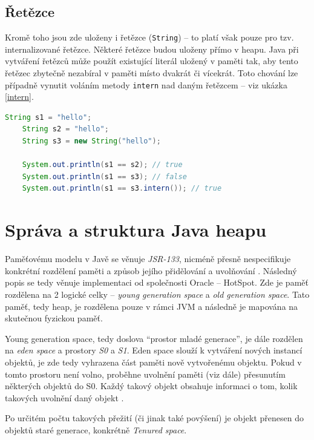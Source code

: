 \subsection{Řetězce}
\label{java-strings}
Kromě toho jsou zde uloženy i řetězce (\texttt{String}) -- to platí však pouze pro tzv. internalizované řetězce. Některé řetězce budou uloženy přímo v heapu. Java při vytváření řetězců může použít existující literál uložený v paměti tak, aby tento řetězec zbytečně nezabíral v paměti místo dvakrát či vícekrát. Toto chování lze případně vynutit voláním metody \texttt{intern} nad daným řetězcem -- viz ukázka \ref{intern}. 

\begin{lstlisting}[caption={Příklad uchovávání řetězců a metody \texttt{intern}}, label={intern}, frame={single}, language={java}, float,floatplacement=H]
    String s1 = "hello";
    String s2 = "hello";
    String s3 = new String("hello");

    System.out.println(s1 == s2); // true
    System.out.println(s1 == s3); // false
    System.out.println(s1 == s3.intern()); // true
\end{lstlisting}

\section{Správa a struktura Java heapu}
\label{memory-management}

Paměťovému modelu v Javě se věnuje \textit{JSR-133}, nicméně přesně nespecifikuje konkrétní rozdělení paměti a způsob jejího přidělování a uvolňování \cite{jsr133}. Následný popis se tedy věnuje implementaci od společnosti Oracle – HotSpot. Zde je paměť rozdělena na 2 logické celky – \textit{young generation space} a \textit{old generation space}. Tato paměť, tedy heap, je rozdělena pouze v rámci JVM a následně je mapována na skutečnou fyzickou paměť.

Young generation space, tedy doslova “prostor mladé generace”, je dále rozdělen na \textit{eden space} a prostory \textit{S0} a \textit{S1}. Eden space slouží k vytváření nových instancí objektů, je zde tedy vyhrazena část paměti nově vytvořenému objektu. Pokud v tomto prostoru není volno, proběhne uvolnění paměti (viz dále) přesunutím některých objektů do S0. Každý takový objekt obsahuje informaci o tom, kolik takových uvolnění daný objekt .

Po určitém počtu takových přežití (či jinak také povýšení) je objekt přenesen do objektů staré generace, konkrétně \textit{Tenured space}.

